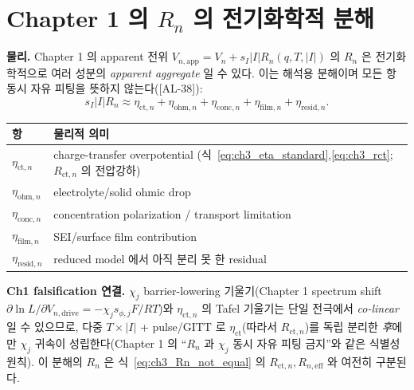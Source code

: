 \documentclass[11pt,a4paper]{article}
\newcommand{\eff}{\mathrm{eff}}
\newcommand{\app}{\mathrm{app}}
\newcommand{\drive}{\mathrm{drive}}
\newcommand{\ct}{\mathrm{ct}}
\newcommand{\resid}{\mathrm{resid}}
\newcommand{\ohm}{\mathrm{ohm}}
\newcommand{\conc}{\mathrm{conc}}
\newcommand{\film}{\mathrm{film}}
\newcommand{\AL}[1]{\textsf{[AL-#1]}}
\begin{document}
\section{Chapter 1 의 $R_n$ 의 전기화학적 분해}\label{sec:ch3_Rn}
\textbf{물리.} Chapter 1 의 apparent 전위 $V_{n,\app}=V_n+s_I|I|R_n(q,T,|I|)$ 의 $R_n$ 은 전기화학적으로 여러
성분의 \emph{apparent aggregate} 일 수 있다. 이는 해석용 분해이며 모든 항 동시 자유 피팅을 뜻하지 않는다(\AL{38}):
\begin{equation}
s_I|I|R_n\approx\eta_{\ct,n}+\eta_{\ohm,n}+\eta_{\conc,n}+\eta_{\film,n}+\eta_{\resid,n}.
\label{eq:ch3_Rn_decomp}
\end{equation}
\begin{longtable}{p{} >{\raggedright\arraybackslash}p{}}
\toprule 항 & 물리적 의미 \\ \midrule \endhead
$\eta_{\ct,n}$ & charge-transfer overpotential (식~\eqref{eq:ch3_eta_standard},\allowbreak\eqref{eq:ch3_rct}; $R_{\ct,n}$ 의 전압강하) \\
$\eta_{\ohm,n}$ & electrolyte/solid ohmic drop \\
$\eta_{\conc,n}$ & concentration polarization / transport limitation \\
$\eta_{\film,n}$ & SEI/surface film contribution \\
$\eta_{\resid,n}$ & reduced model 에서 아직 분리 못 한 residual \\
\bottomrule
\end{longtable}
\textbf{Ch1 falsification 연결.} $\chi_j$ barrier-lowering 기울기(Chapter 1 spectrum shift
$\partial\ln L/\partial V_{n,\drive}=-\chi_j s_{\phi,j}F/RT$)와 $\eta_{\ct,n}$ 의 Tafel 기울기는 단일 전극에서
\emph{co-linear} 일 수 있으므로, 다중 $T\times|I|$ + pulse/GITT 로 $\eta_{\ct}$(따라서 $R_{\ct,n}$)를 독립
분리한 \emph{후}에만 $\chi_j$ 귀속이 성립한다(Chapter 1 의 ``$R_n$ 과 $\chi_j$ 동시 자유 피팅 금지''와 같은
식별성 원칙). 이 분해의 $R_n$ 은 식~\eqref{eq:ch3_Rn_not_equal} 의 $R_{\ct,n},R_{n,\eff}$ 와 여전히 구분된다.

\end{document}
